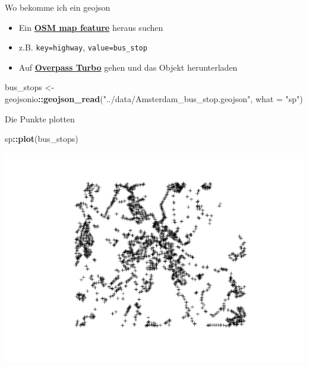 \documentclass[ignorenonframetext,]{beamer}
\newenvironment{Shaded}{\begin{snugshade}}{\end{snugshade}}
\newcommand{\DataTypeTok}[1]{\textcolor[rgb]{0.13,0.29,0.53}{#1}}
\newcommand{\KeywordTok}[1]{\textcolor[rgb]{0.13,0.29,0.53}{\textbf{#1}}}
\newcommand{\NormalTok}[1]{#1}
\newcommand{\OperatorTok}[1]{\textcolor[rgb]{0.81,0.36,0.00}{\textbf{#1}}}
\newcommand{\StringTok}[1]{\textcolor[rgb]{0.31,0.60,0.02}{#1}}
\providecommand{\tightlist}{%
  \setlength{\itemsep}{0pt}\setlength{\parskip}{0pt}}
\begin{document}
\begin{frame}[fragile]{Wo bekomme ich ein geojson}
\protect\hypertarget{wo-bekomme-ich-ein-geojson}{}

\begin{itemize}
\tightlist
\item
  Ein
  \href{https://wiki.openstreetmap.org/wiki/Map_Features}{\textbf{OSM
  map feature}} heraus suchen
\item
  z.B. \texttt{key=highway}, \texttt{value=bus\_stop}
\item
  Auf \href{https://overpass-turbo.eu/}{\textbf{Overpass Turbo}} gehen
  und das Objekt herunterladen
\end{itemize}

\begin{Shaded}
\begin{Highlighting}[]
\NormalTok{bus_stops <-}\StringTok{ }\NormalTok{geojsonio}\OperatorTok{::}\KeywordTok{geojson_read}\NormalTok{(}\StringTok{"../data/Amsterdam_bus_stop.geojson"}\NormalTok{,}
  \DataTypeTok{what =} \StringTok{"sp"}\NormalTok{)}
\end{Highlighting}
\end{Shaded}

\end{frame}

\begin{frame}[fragile]{Die Punkte plotten}
\protect\hypertarget{die-punkte-plotten}{}

\begin{Shaded}
\begin{Highlighting}[]
\NormalTok{sp}\OperatorTok{::}\KeywordTok{plot}\NormalTok{(bus_stops)}
\end{Highlighting}
\end{Shaded}

\includegraphics{B6_using_javascript_files/figure-beamer/unnamed-chunk-30-1.pdf}

\end{frame}
\end{document}

